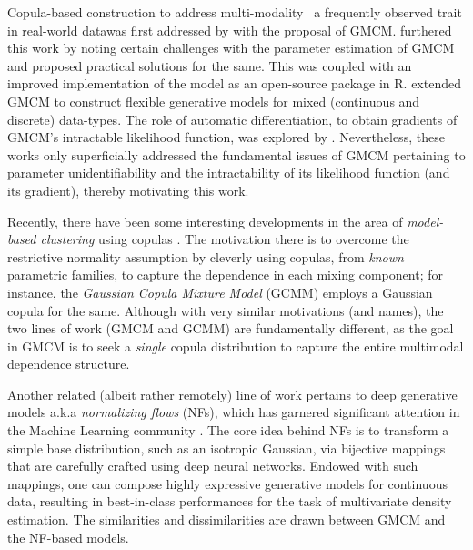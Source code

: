 \documentclass{article}
\theoremstyle{plain}
\theoremstyle{definition}
\theoremstyle{remark}
\begin{document}
Copula-based construction to address multi-modality \textemdash \ a frequently observed trait in real-world data\textemdash was first addressed by \citet{Tewari2011} with the proposal of GMCM. \citet{Bilgrau2016} furthered this work by noting certain challenges with the parameter estimation of GMCM and proposed practical solutions for the same. This was coupled with an improved implementation of the model as an open-source package \citep{Bilgrau_Rpackage} in R. \citet{Rajan2016_GMCM_mixed_data} extended GMCM to construct flexible generative models for mixed (continuous and discrete) data-types. The role of automatic differentiation, to obtain gradients of GMCM's intractable likelihood function, was explored by \citet{kasa2018}. Nevertheless, these works only superficially addressed the fundamental issues of GMCM pertaining to parameter unidentifiability and the intractability of its likelihood function (and its gradient), thereby motivating this work.

Recently, there have been some interesting developments in the area of \emph{model-based clustering} using copulas \citep{Kosmidis2016,Mazo2017,Marbac2017,Rey2012_CopulaMixture}. The motivation there is to overcome the restrictive normality assumption by cleverly using copulas, from \emph{known} parametric families, to capture the dependence in each mixing component; for instance, the \emph{Gaussian Copula Mixture Model} (GCMM) \citep{Marbac2017} employs a Gaussian copula for the same. Although with very similar motivations (and names), the two lines of work (GMCM and GCMM) are fundamentally different, as the goal in GMCM is to seek a \emph{single} copula distribution to capture the entire multimodal dependence structure. 

Another related (albeit rather remotely) line of work pertains to deep generative models a.k.a \emph{normalizing flows} (NFs), which has garnered significant attention in the Machine Learning community \citep[see][for a comprehensive review on NFs]{Kobyzev2021}. The core idea behind NFs is to transform a simple base distribution, such as an isotropic Gaussian, via bijective mappings that are carefully crafted using deep neural networks. Endowed with such mappings, one can compose highly expressive generative models for continuous data, resulting in best-in-class performances for the task of multivariate density estimation. The similarities and dissimilarities are drawn between GMCM and the NF-based models.   
\end{document}
